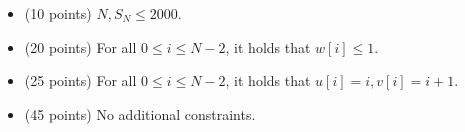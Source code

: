 \documentclass[12pt]{scrartcl}
\begin{document}


    \begin{itemize}
        \item (10 points) $N, S_N \le 2000$.
        \item (20 points) For all $0 \le i \le N - 2$, it holds that $w[i] \le 1$.
        \item (25 points) For all $0 \le i \le N - 2$, it holds that $u[i] = i, v[i] = i + 1$.
        \item (45 points) No additional constraints.
    \end{itemize}
\end{document}
